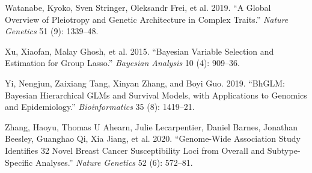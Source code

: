 \begin{CSLReferences}{1}{0}
\leavevmode{}%
Watanabe, Kyoko, Sven Stringer, Oleksandr Frei, et al. 2019. {``A Global Overview of Pleiotropy and Genetic Architecture in Complex Traits.''} \emph{Nature Genetics} 51 (9): 1339--48.

\leavevmode{}%
Xu, Xiaofan, Malay Ghosh, et al. 2015. {``Bayesian Variable Selection and Estimation for Group Lasso.''} \emph{Bayesian Analysis} 10 (4): 909--36.

\leavevmode{}%
Yi, Nengjun, Zaixiang Tang, Xinyan Zhang, and Boyi Guo. 2019. {``BhGLM: Bayesian Hierarchical GLMs and Survival Models, with Applications to Genomics and Epidemiology.''} \emph{Bioinformatics} 35 (8): 1419--21.

\leavevmode{}%
Zhang, Haoyu, Thomas U Ahearn, Julie Lecarpentier, Daniel Barnes, Jonathan Beesley, Guanghao Qi, Xia Jiang, et al. 2020. {``Genome-Wide Association Study Identifies 32 Novel Breast Cancer Susceptibility Loci from Overall and Subtype-Specific Analyses.''} \emph{Nature Genetics} 52 (6): 572--81.

\end{CSLReferences}



\address{%
Taban Baghfalaki\\
Tarbiat Modares University\\%
Faculty of Mathematical scinces\\ Tehran, Iran.\\
Université Paris-Saclay; UVSQ; INSERM, U1018; Gustave Roussy; CESP, Team Exposome and Heredity\\%
Villejuif, France\\
%
%
\textit{ORCiD: \href{https://orcid.org/0000-0002-2100-4532}{0000-0002-2100-4532}}\\%
\href{mailto:t.baghfalaki@modares.ac.ir}{\nolinkurl{t.baghfalaki@modares.ac.ir}}%
}

\address{%
Pierre-Emmanuel Sugier\\
Laboratoire de Mathématiques et de leurs Applications de Pau\\%
Université de Pau et des Pays de l'Adour,\\ UMR CNRS 5142, E2S-UPPA, France.\\
Université Paris-Saclay; UVSQ; INSERM, U1018; Gustave Roussy; CESP, Team Exposome and Heredity\\%
Villejuif, France\\
%
%
\textit{ORCiD: \href{https://orcid.org/0000-0002-5846-1104}{0000-0002-5846-1104}}\\%
\href{mailto:pe.sugier@univ-pau.fr}{\nolinkurl{pe.sugier@univ-pau.fr}}%
}

